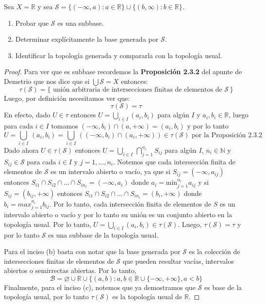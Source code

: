 \documentclass{article}
\theoremstyle{definition}
\newcommand{\R}{\mathbb{R}}
\newcommand{\N}{\mathbb{N}}
\newenvironment{ejercicio}[1]{\begin{trivlist}
\item[\hskip \labelsep {\bfseries Ejercicio}\hskip \labelsep {\bfseries #1.}]}{\end{trivlist}}
\begin{document}
\begin{ejercicio}{8}
    Sea \( X = \R \) y sea \( \mathcal{S} = \{ (-\infty,a) : a \in \R \} \cup \{ (b,\infty) : b \in \R \} \).
    \begin{enumerate}
        \item Probar que \(\mathcal{S}\) es una subbase.
        \item Determinar explícitamente la base generada por \(\mathcal{S}\).
        \item Identificar la topología generada y compararla con la topología usual.
    \end{enumerate}
\end{ejercicio}
\begin{proof}
    Para ver que es subbase recordemos la \textbf{Proposición 2.3.2} del apunte de Demetrio que nos dice que si \( \bigcup \mathcal{S} = X \) entonces: \[
        \tau(\mathcal{S}) = \{ \text{ unión arbitraria de intersecciones finitas de elementos de } \mathcal{S} \, \}
    \]
    Luego, por definición necesitamos ver que: \[
        \tau(\mathcal{S}) = \tau
    \]
    En efecto, dado \( U \in \tau \) entonces \( U = \bigcup_{i \in I} (a_i, b_i) \) para algún \( I \) y \( a_i, b_i \in \R \), luego para cada \( i \in I \) tomamos \( (-\infty, b_i) \cap (a, +\infty) = (a_i, b_i) \) y por lo tanto \[
        U = \bigcup_{i \in I} \, (a_i, b_i) = \bigcup_{i \in I} \, \left( (-\infty, b_i) \cap (a_i, +\infty) \right) \in \tau(\mathcal{S}) \text{ por la Proposición 2.3.2}
    \]
    Dado ahora \( U \in \tau(\mathcal{S}) \) entonces \( U = \bigcup_{i \in I} \, \bigcap_{j = 1}^{n_i} S_{ij} \) para algún \( I \), \( n_i \in \N \) y \( S_{ij} \in \mathcal{S} \) para cada \( i \in I \) y \( j = 1, \ldots, n_i \). Notemos que cada intersección finita de elementos de \( \mathcal{S} \) es un intervalo abierto o vacío, ya que si \( S_{ij} = (-\infty, a_{ij}) \) entonces \( S_{i1} \cap S_{i2} \cap \ldots \cap S_{in_i} = (-\infty, a_i) \) donde \( a_i = \text{min}_{j = 1}^{n_i} a_{ij} \) y si \( S_{ij} = (b_{ij}, +\infty) \) entonces \( S_{i1} \cap S_{i2} \cap \ldots \cap S_{in_i} = (b_i, +\infty) \) donde \( b_i = max_{j = 1}^{n_i} b_{ij} \). Por lo tanto, cada intersección finita de elementos de \( S \) es un intervalo abierto o vacío y por lo tanto su unión es un conjunto abierto en la topología usual. Por lo tanto, \( U = \bigcup_{i\in I} (a_i, b_i) \in \tau(\mathcal{S})\). Luego, \( \tau(\mathcal{S}) = \tau \) y por lo tanto \( \mathcal{S} \) es una subbase de la topología usual.

    Para el inciso (b) basta con notar que la base generada por \( \mathcal{S} \) es la colección de intersecciones finitas de elementos de \( \mathcal{S} \) que pueden resultar vacías, intervalos abiertos o semirrectas abiertas. Por lo tanto, \[
        \mathcal{B} = \varnothing \cup \R \cup \{ (a, b) : a, b \in \R \cup \{-\infty, +\infty \}, a < b \}
    \]
    Finalmente, para el inciso (c), notemos que ya demostramos que \( \mathcal{S} \) es base de la topología usual, por lo tanto \( \tau(\mathcal{S}) \) es la topología usual de \( \R \).
\end{proof}
\end{document}
